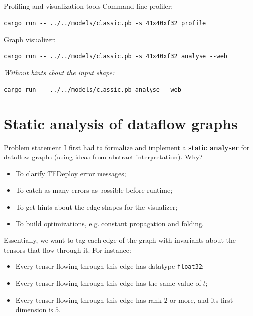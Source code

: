 \documentclass{beamer}
\begin{document}
\begin{frame}[fragile]{Profiling and visualization tools}
Command-line profiler:
\begin{exampleblock}{}
\footnotesize
\begin{verbatim}
cargo run -- ../../models/classic.pb -s 41x40xf32 profile
\end{verbatim}
\end{exampleblock}


\bigskip
Graph visualizer:
\begin{exampleblock}{}
\footnotesize
\begin{verbatim}
cargo run -- ../../models/classic.pb -s 41x40xf32 analyse --web
\end{verbatim}
\end{exampleblock}


\small{\textit{Without hints about the input shape:}}
\begin{exampleblock}{}
\footnotesize
\begin{verbatim}
cargo run -- ../../models/classic.pb analyse --web
\end{verbatim}
\end{exampleblock}
\end{frame}

\section{Static analysis of dataflow graphs}

\begin{frame}{Problem statement}
I first had to formalize and implement a \textbf{static analyser} for dataflow graphs (using ideas from abstract interpretation). Why?

\begin{itemize}
    \item To clarify TFDeploy error messages;
    \item To catch as many errors as possible before runtime;
    \item To get hints about the edge shapes for the visualizer;
    \item To build optimizations, e.g. constant propagation and folding.
\end{itemize}

\bigskip
Essentially, we want to tag each edge of the graph with invariants about the tensors that flow through it. For instance:
\begin{itemize}
    \item<1-> Every tensor flowing through this edge has datatype \texttt{float32};
    \item<2-> Every tensor flowing through this edge has the same value of $t$;
    \item<3-> Every tensor flowing through this edge has rank $2$ or more, and its first dimension is $5$.
\end{itemize}
\end{frame}
\end{document}
